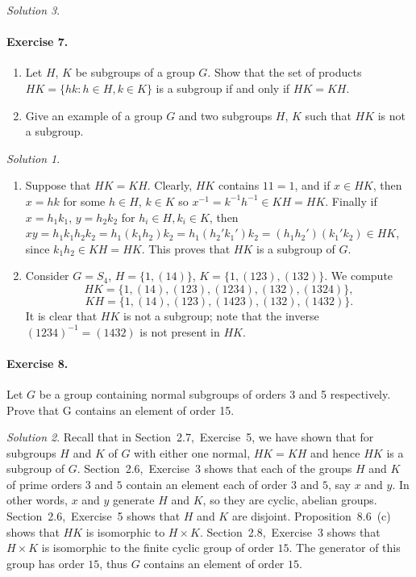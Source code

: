 \documentclass[11pt]{report}
\theoremstyle{remark}
\newtheorem*{solution}{Solution}
\begin{document}
\begin{solution}
    \paragraph{Exercise 7.} \mbox{}
    \begin{enumerate}
        \itemsep0em
        \item Let $H$, $K$ be subgroups of a group $G$. Show that the set of
        products $HK = \{hk: h \in H, k \in K\}$ is a subgroup if and only if $HK =
        KH$.
        \item Give an example of a group $G$ and two subgroups $H$, $K$ such that
        $HK$ is not a subgroup.
    \end{enumerate}
    \begin{solution} \mbox{}
    \begin{enumerate}
        \item Suppose that $HK = KH$. Clearly, $HK$ contains $1 1 = 1$, and if $x
        \in HK$, then $x = hk$ for some $h\in H$, $k \in K$ so $x^{-1} =
        k^{-1}h^{-1} \in KH = HK$. Finally if $x = h_1k_1$, $y = h_2k_2$ for $h_i
        \in H, k_i \in K$, then $xy = h_1k_1h_2k_2 = h_1(k_1h_2)k_2 =
        h_1(h_2'k_1')k_2 = (h_1h_2')(k_1'k_2) \in HK$, since $k_1h_2 \in KH = HK$.
        This proves that $HK$ is a subgroup of $G$.

        \item Consider $G = S_4$, $H = \{1, (14)\}$, $K = \{1, (123), (132)\}$. We
        compute \[
            HK = \{1, (14), (123), (1234), (132), (1324)\},
        \] \[
            KH = \{1, (14), (123), (1423), (132), (1432)\}.
        \] It is clear that $HK$ is not a subgroup; note that the inverse
        $(1234)^{-1} = (1432)$ is not present in $HK$.
    \end{enumerate}
    \end{solution}

    \paragraph{Exercise 8.} Let $G$ be a group containing normal subgroups of orders
    3 and 5 respectively. Prove that G contains an element of order 15.
    \begin{solution}
        Recall that in Section~2.7,~Exercise~5, we have shown that for subgroups $H$
        and $K$ of $G$ with either one normal, $HK = KH$ and hence $HK$ is a
        subgroup of $G$. Section~2.6,~Exercise~3 shows that each of the
        groups $H$ and $K$ of prime orders $3$ and $5$ contain an element each of
        order $3$ and $5$, say $x$ and $y$. In other words, $x$ and $y$ generate
        $H$ and $K$, so they are cyclic, abelian groups. Section~2.6,~Exercise~5
        shows that $H$ and $K$ are disjoint. Proposition~8.6~(c) shows that $HK$ is
        isomorphic to $H \times K$. Section~2.8,~Exercise~3 shows that $H\times K$
        is isomorphic to the finite cyclic group of order $15$. The generator of
        this group has order $15$, thus $G$ contains an element of order $15$.
    \end{solution}


\end{solution}
\end{document}
